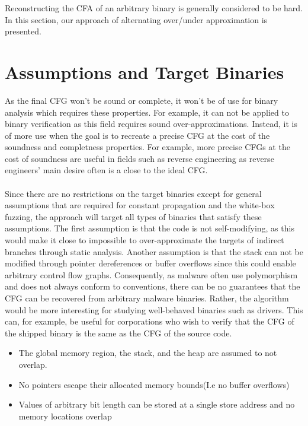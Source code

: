 \documentclass{kththesis}
\begin{document}

Reconstructing the CFA of an arbitrary binary is generally considered to be hard\cite{Jakstab}. In this section, our approach of alternating over/under approximation is presented.

\section{Assumptions and Target Binaries}
%
%
As the final CFG won't be sound or complete, it won't be of use for binary analysis which requires these properties. For example, it can not be applied to binary verification as this field requires sound over-approximations. Instead, it is of more use when the goal is to recreate a precise CFG at the cost of the soundness and completness properties. For example, more precise CFGs at the cost of soundness are useful in fields such as reverse engineering as reverse engineers' main desire often is a close to the ideal CFG.
\\ \\
Since there are no restrictions on the target binaries except for general assumptions that are required for constant propagation and the white-box fuzzing, the approach will target all types of binaries that satisfy these assumptions. The first assumption is that the code is not self-modifying, as this would make it close to impossible to over-approximate the targets of indirect branches through static analysis. Another assumption is that the stack can not be modified through pointer dereferences or buffer overflows since this could enable arbitrary control flow graphs. Consequently, as malware often use polymorphism and does not always conform to conventions, there can be no guarantees that the CFG can be recovered from arbitrary malware binaries. Rather, the algorithm would be more interesting for studying well-behaved binaries such as drivers. This can, for example, be useful for corporations who wish to verify that the CFG of the shipped binary is the same as the CFG of the source code.

\begin{itemize}
    \item The global memory region, the stack, and the heap are assumed to not overlap.
    \item No pointers escape their allocated memory bounds(I.e no buffer overflows)
    \item Values of arbitrary bit length can be stored at a single store address and no memory locations overlap
\end{itemize}
\end{document}
